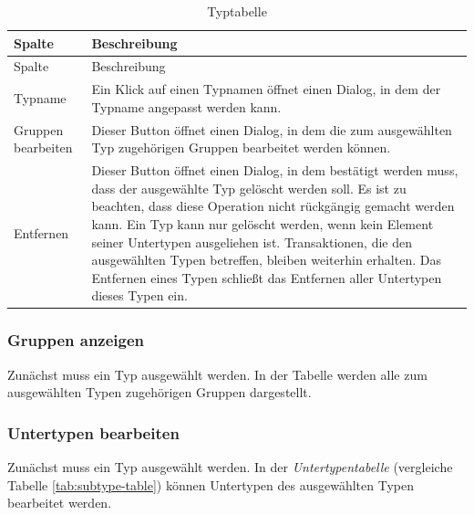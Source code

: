 \documentclass[
]{article}
\begin{document}
\begin{longtable}[]{@{}
  >{\raggedright\arraybackslash}p{}
  >{\raggedright\arraybackslash}p{}@{}}
\caption{\label{tab:type-table} Typtabelle}\tabularnewline
\toprule
Spalte & Beschreibung \\
\midrule
\endfirsthead
\toprule
Spalte & Beschreibung \\
\midrule
\endhead
Typname & Ein Klick auf einen Typnamen öffnet einen Dialog, in dem der Typname angepasst werden kann. \\
Gruppen bearbeiten & Dieser Button öffnet einen Dialog, in dem die zum ausgewählten Typ zugehörigen Gruppen bearbeitet werden können. \\
Entfernen & Dieser Button öffnet einen Dialog, in dem bestätigt werden muss, dass der ausgewählte Typ gelöscht werden soll. Es ist zu beachten, dass diese Operation nicht rückgängig gemacht werden kann. Ein Typ kann nur gelöscht werden, wenn kein Element seiner Untertypen ausgeliehen ist. Transaktionen, die den ausgewählten Typen betreffen, bleiben weiterhin erhalten. Das Entfernen eines Typen schließt das Entfernen aller Untertypen dieses Typen ein. \\
\bottomrule
\end{longtable}

\hypertarget{gruppen-anzeigen}{%
\subsubsection{Gruppen anzeigen}\label{gruppen-anzeigen}}

Zunächst muss ein Typ ausgewählt werden. In der Tabelle werden alle zum ausgewählten Typen zugehörigen Gruppen dargestellt.

\hypertarget{untertypen-bearbeiten}{%
\subsubsection{Untertypen bearbeiten}\label{untertypen-bearbeiten}}

Zunächst muss ein Typ ausgewählt werden. In der \emph{Untertypentabelle} (vergleiche Tabelle \ref{tab:subtype-table}) können Untertypen des ausgewählten Typen bearbeitet werden.
\end{document}

